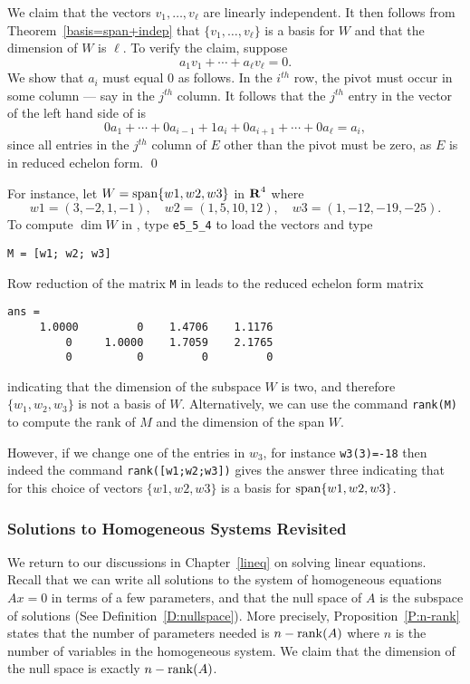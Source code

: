 We claim that the vectors $v_1,\ldots,v_\ell$ are linearly
independent.  It then follows from Theorem~\ref{basis=span+indep} that
$\{v_1,\ldots,v_\ell\}$ is a basis for $W$ and that the dimension of
$W$ is $\ell$.  To verify the claim, suppose
\begin{equation} \label{e:rowsums}
a_1v_1 + \cdots + a_\ell v_\ell = 0.
\end{equation}
We show that $a_i$ must equal $0$ as follows.  In the $i^{th}$
row, the pivot must occur in some column --- say in the $j^{th}$
column.  It follows that the $j^{th}$ entry in the vector of the
left hand side of  is
\[
0a_1 + \cdots + 0a_{i-1} +1a_i + 0a_{i+1} + \cdots + 0a_\ell =
a_i,
\]
since all entries in the $j^{th}$ column of $E$ other than the
pivot must be zero, as $E$ is in reduced echelon form.  \qed

For instance, let $W={\rm span}\{w1,w2,w3\}$ in $\mbox{$\bf{R}$}^4$ where
\begin{equation*} \label{eq:vectors}
w1 = (3, -2, 1,-1), \quad w2 = (1,5,10,12), \quad
w3 = (1,-12,-19,-25).
\end{equation*}%
To compute $\dim W$ in \Matlab, type \verb+e5_5_4+ to load the
vectors and type
\begin{verbatim}
M = [w1; w2; w3]
\end{verbatim}
Row reduction of the matrix {\tt M} in \Matlab
leads to the reduced echelon form matrix
\begin{verbatim}
ans =
     1.0000         0    1.4706    1.1176
         0     1.0000    1.7059    2.1765
         0          0         0         0
\end{verbatim}
indicating that the dimension of the subspace $W$ is two, and
therefore $\{w_1,w_2,w_3\}$ is not a basis of $W$. Alternatively,
we can use the \Matlab command {\tt rank(M)}
to compute the rank of $M$ and the dimension of the span $W$.

However, if we change one of the entries in $w_3$, for instance
{\tt w3(3)=-18} then indeed the command {\tt rank([w1;w2;w3])}
gives the answer three indicating that for this choice of vectors
$\{w1,w2,w3\}$ is a basis for ${\rm span}\{w1,w2,w3\}$.

\subsubsection*{Solutions to Homogeneous Systems Revisited}

We return to our discussions in Chapter~\ref{lineq} on solving
linear equations.  Recall that we can write all solutions to
the system of homogeneous equations $Ax=0$ in terms of a few
parameters, and that the null space of $A$ is the subspace of
solutions (See Definition~\ref{D:nullspace}).
More precisely, Proposition~\ref{P:n-rank} states that the number of
parameters needed is $n-{\rm rank}(A)$ where $n$ is the number of
variables in the homogeneous system.  We claim that the dimension
of the null space is exactly
$n - {\rm rank}(A)$.

